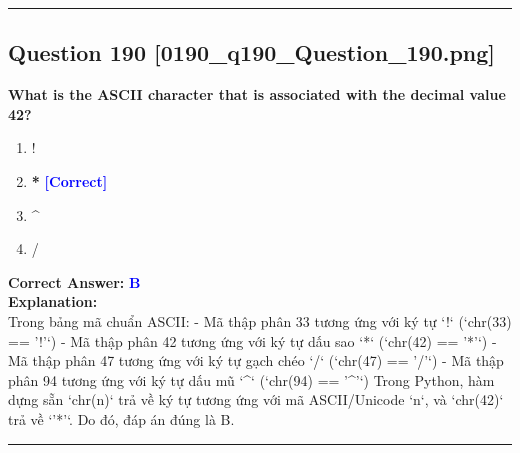 \documentclass[11pt,a4paper]{article}
\begin{document}
\vspace{0.8cm}
\hrule
\vspace{0.5cm}

\begin{minipage}{\textwidth}
\subsection*{Question 190 \quad \footnotesize{[0190_q190_Question_190.png]}}
\noindent \textbf{What is the ASCII character that is associated with the decimal value 42?}

\begin{enumerate}[label=\Alph*.]
    \item !
    \item \textbf{*} \hfill \textcolor{blue}{\textbf{[Correct]}}
    \item ^
    \item /
\end{enumerate}

\noindent \textbf{Correct Answer:} \textcolor{blue}{\textbf{B}} \\[4pt]
\noindent \textbf{Explanation:}\\
Trong bảng mã chuẩn ASCII:\newline
- Mã thập phân 33 tương ứng với ký tự `!` (`chr(33) == '!'`)\newline
- Mã thập phân 42 tương ứng với ký tự dấu sao `*` (`chr(42) == '*'`)\newline
- Mã thập phân 47 tương ứng với ký tự gạch chéo `/` (`chr(47) == '/'`)\newline
- Mã thập phân 94 tương ứng với ký tự dấu mũ `^` (`chr(94) == '^'`)\newline
Trong Python, hàm dựng sẵn `chr(n)` trả về ký tự tương ứng với mã ASCII/Unicode `n`, và `chr(42)` trả về `'*'`. Do đó, đáp án đúng là B.
\end{minipage}
\vspace{0.8cm}
\hrule
\vspace{0.5cm}
\end{document}
